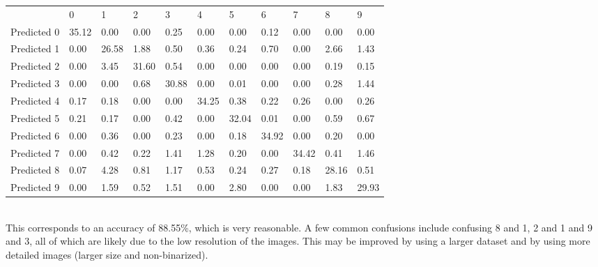 \documentclass[10pt]{article}
\begin{document}
\begin{table}[h]
\centering
\begin{tabular}{lllllllllll}
            & 0     & 1     & 2     & 3     & 4     & 5     & 6     & 7     & 8     & 9     \\
Predicted 0 & 35.12 & 0.00  & 0.00  & 0.25  & 0.00  & 0.00  & 0.12  & 0.00  & 0.00  & 0.00  \\
Predicted 1 & 0.00  & 26.58 & 1.88  & 0.50  & 0.36  & 0.24  & 0.70  & 0.00  & 2.66  & 1.43  \\
Predicted 2 & 0.00  & 3.45  & 31.60 & 0.54  & 0.00  & 0.00  & 0.00  & 0.00  & 0.19  & 0.15  \\
Predicted 3 & 0.00  & 0.00  & 0.68  & 30.88 & 0.00  & 0.01  & 0.00  & 0.00  & 0.28  & 1.44  \\
Predicted 4 & 0.17  & 0.18  & 0.00  & 0.00  & 34.25 & 0.38  & 0.22  & 0.26  & 0.00  & 0.26  \\
Predicted 5 & 0.21  & 0.17  & 0.00  & 0.42  & 0.00  & 32.04 & 0.01  & 0.00  & 0.59  & 0.67  \\
Predicted 6 & 0.00  & 0.36  & 0.00  & 0.23  & 0.00  & 0.18  & 34.92 & 0.00  & 0.20  & 0.00  \\
Predicted 7 & 0.00  & 0.42  & 0.22  & 1.41  & 1.28  & 0.20  & 0.00  & 34.42 & 0.41  & 1.46  \\
Predicted 8 & 0.07  & 4.28  & 0.81  & 1.17  & 0.53  & 0.24  & 0.27  & 0.18  & 28.16 & 0.51  \\
Predicted 9 & 0.00  & 1.59  & 0.52  & 1.51  & 0.00  & 2.80  & 0.00  & 0.00  & 1.83  & 29.93
\end{tabular}
\end{table}\\
This corresponds to an accuracy of 88.55\%, which is very reasonable. A few common confusions include confusing 8 and 1, 2 and 1 and 9 and 3, all of which are likely due to the low resolution of the images. This may be improved by using a larger dataset and by using more detailed images (larger size and non-binarized). 
\end{document}
